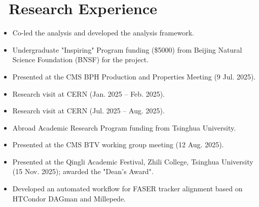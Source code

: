 \documentclass{resume}
\begin{document}

\section{\faBook\ Research Experience}
\begin {itemize}
  \item Co-led the analysis and developed the analysis framework.
  \item Undergraduate "Inspiring" Program funding (\$5000) from Beijing Natural Science Foundation (BNSF) for the project.
  \item Presented at the CMS BPH Production and Properties Meeting (9 Jul. 2025).
  \item Research visit at CERN (Jan. 2025 -- Feb. 2025).
\end{itemize}


\begin {itemize}
  \item Research visit at CERN (Jul. 2025 -- Aug. 2025).
  \item Abroad Academic Research Program funding from Tsinghua University.
  \item Presented at the CMS BTV working group meeting (12 Aug. 2025).
  \item Presented at the Qingli Academic Festival, Zhili College, Tsinghua University (15 Nov. 2025); awarded the "Dean's Award".
\end{itemize}


\begin {itemize}
  \item Developed an automated workflow for FASER tracker alignment based on HTCondor DAGman and Millepede.
\end{itemize}
\end{document}
